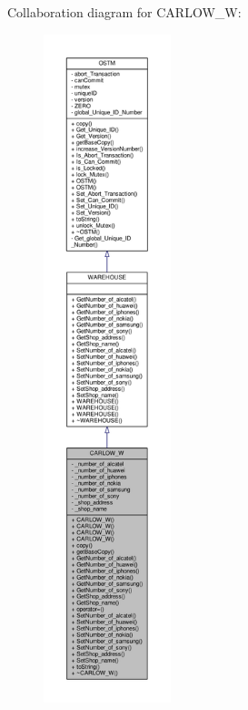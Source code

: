 Collaboration diagram for C\+A\+R\+L\+O\+W\+\_\+W\+:\nopagebreak
\begin{figure}[H]
\begin{center}
\leavevmode
\includegraphics[height=550pt]{class_c_a_r_l_o_w___w__coll__graph}
\end{center}
\end{figure}
